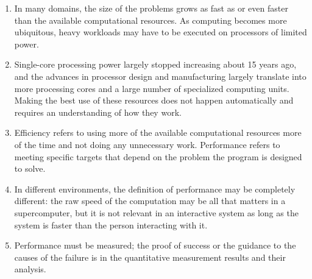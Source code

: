 \begin{enumerate}
\item 
In many domains, the size of the problems grows as fast as or even faster than the available computational resources. As computing becomes more ubiquitous, heavy workloads may have to be executed on processors of limited power.

\item 
Single-core processing power largely stopped increasing about 15 years ago, and the advances in processor design and manufacturing largely translate into more processing cores and a large number of specialized computing units. Making the best use of these resources does not happen automatically and requires an understanding of how they work.

\item 
Efficiency refers to using more of the available computational resources more of the time and not doing any unnecessary work. Performance refers to meeting specific targets that depend on the problem the program is designed to solve.

\item
In different environments, the definition of performance may be completely different: the raw speed of the computation may be all that matters in a supercomputer, but it is not relevant in an interactive system as long as the system is faster than the person interacting with it.

\item
Performance must be measured; the proof of success or the guidance to the causes of the failure is in the quantitative measurement results and their analysis.
	
\end{enumerate}